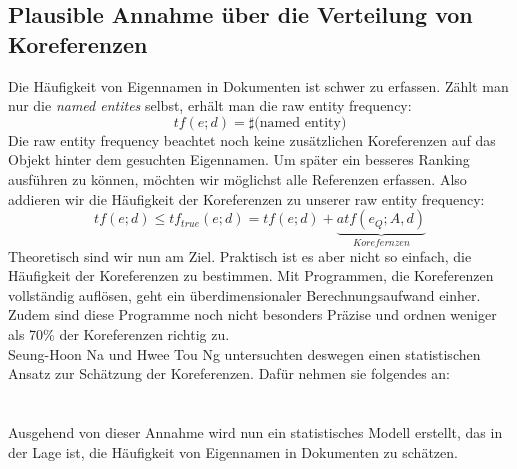 \subsection{Plausible Annahme über die Verteilung von Koreferenzen}
Die Häufigkeit von Eigennamen in Dokumenten ist schwer zu erfassen. Zählt man nur die \textit{named entites} selbst, erhält man die raw entity frequency:
\[tf\left( e;d \right)=\sharp \text{(named entity)}\]
Die raw entity frequency beachtet  noch keine zusätzlichen Koreferenzen auf das Objekt hinter dem gesuchten Eigennamen. Um später ein besseres Ranking ausführen zu können, möchten wir möglichst alle Referenzen erfassen. Also addieren wir die Häufigkeit der Koreferenzen zu unserer raw entity frequency:
\[tf\left( e;d \right)\leq tf_{true}\left( e;d \right)=tf\left( e;d \right)+\underbrace{atf(e_Q;A,d)}_{Korefernzen}\]
Theoretisch sind wir nun am Ziel. Praktisch ist es aber nicht so einfach, die Häufigkeit der Koreferenzen zu bestimmen. Mit Programmen, die Koreferenzen vollständig auflösen, geht ein überdimensionaler Berechnungsaufwand einher. Zudem sind diese Programme noch nicht besonders Präzise und ordnen weniger als 70\% der Koreferenzen richtig zu.\cite{paper:Na}
\\
Seung-Hoon Na und Hwee Tou Ng untersuchten deswegen einen statistischen Ansatz zur Schätzung der Koreferenzen. Dafür nehmen sie folgendes an:
\\
\\
\\
Ausgehend von dieser Annahme wird nun ein statistisches Modell erstellt, das in der Lage ist, die Häufigkeit von Eigennamen in Dokumenten zu schätzen.
